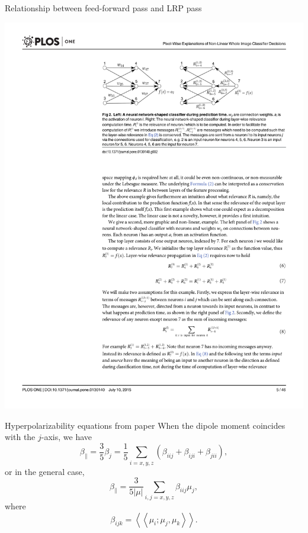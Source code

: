 \documentclass[xetex,compress]{beamer}
\begin{document}
\begin{frame}{Relationship between feed-forward pass and LRP pass}
  \begin{center}
    \includegraphics[width=1.05\textwidth]{./figures/fig2_trimmed.pdf}
  \end{center}
\end{frame}

\begin{frame}{Hyperpolarizability equations from paper}
  When the dipole moment coincides with the \(j\)-axis, we have
  \begin{equation*}
    \beta_{\parallel} = \frac{3}{5}\beta_j = \frac{1}{5} \sum_{i=x,y,z} (\beta_{iij} + \beta_{iji} + \beta_{jii}),
  \end{equation*}
  or in the general case,
  \begin{equation*}
    \beta_{\parallel} = \frac{3}{5|\mu|} \sum_{i,j=x,y,z} \beta_{iij} \mu_{j},
  \end{equation*}
  where
  \begin{equation*}
    \beta_{ijk} = \left<\left<\mu_{i};\mu_{j},\mu_{k}\right>\right>.
  \end{equation*}
\end{frame}
\end{document}
